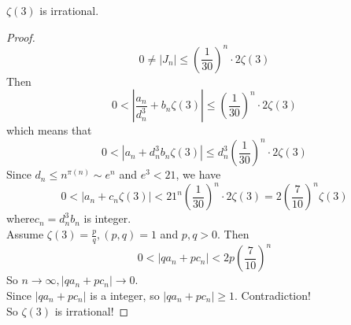 \begin{theorem}\label{zeta_3_irrational}
    $\zeta(3)$ is irrational.
\end{theorem}
\begin{proof}
    \leanok
    \[ 0 \neq |J_n| \leqslant (\frac{1}{30})^n\cdot 2\zeta(3) \]
    Then 
    \[ 0 < |\frac{a_n}{d_n^3} + b_n\zeta(3)| \leqslant (\frac{1}{30})^n\cdot 2\zeta(3) \]
    which means that 
    \[ 0 < |a_n + d_n^3 b_n\zeta(3)| \leqslant d_n^3(\frac{1}{30})^n\cdot 2\zeta(3) \] 
    Since $d_n \leqslant n^{\pi(n)} \sim e^n$ and $e^3 < 21$, we have
    \[ 0 < |a_n + c_n\zeta(3)| < 21^n (\frac{1}{30})^n\cdot 2\zeta(3) = 2(\frac{7}{10})^n \zeta(3) \]
    where$c_n = d_n^3 b_n$ is integer.\\
    Assume $\zeta(3) = \frac{p}{q}, (p,q)=1$ and $p,q>0$. Then 
    \[ 0 < |qa_n + pc_n| < 2p (\frac{7}{10})^n \]
    So $n \rightarrow \infty, |qa_n + pc_n| \rightarrow 0$.\\
    Since $|qa_n + pc_n|$ is a integer, so $|qa_n + pc_n| \geqslant 1$. Contradiction! \\
    So $\zeta(3)$ is irrational!
\end{proof}